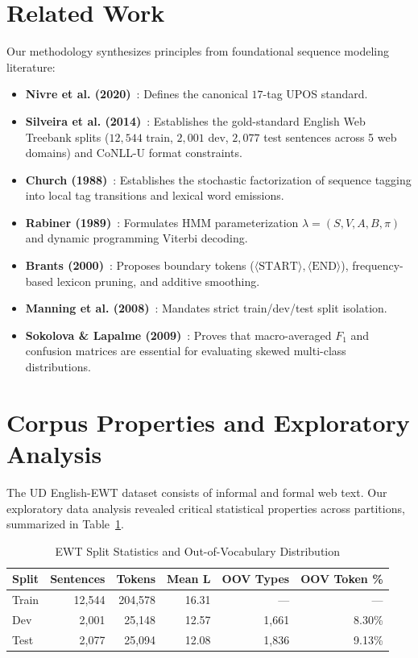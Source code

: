 \documentclass[conference]{IEEEtran}
\begin{document}
\section{Related Work}
Our methodology synthesizes principles from foundational sequence modeling literature:
\begin{itemize}
    \item \textbf{Nivre et al. (2020)}~\cite{nivre2020universal}: Defines the canonical $17$-tag UPOS standard.
    \item \textbf{Silveira et al. (2014)}~\cite{silveira2014gold}: Establishes the gold-standard English Web Treebank splits ($12,544$ train, $2,001$ dev, $2,077$ test sentences across 5 web domains) and CoNLL-U format constraints.
    \item \textbf{Church (1988)}~\cite{church1988stochastic}: Establishes the stochastic factorization of sequence tagging into local tag transitions and lexical word emissions.
    \item \textbf{Rabiner (1989)}~\cite{rabiner1989tutorial}: Formulates HMM parameterization $\lambda = (S, V, A, B, \pi)$ and dynamic programming Viterbi decoding.
    \item \textbf{Brants (2000)}~\cite{brants2000tnt}: Proposes boundary tokens ($\langle\text{START}\rangle, \langle\text{END}\rangle$), frequency-based lexicon pruning, and additive smoothing.
    \item \textbf{Manning et al. (2008)}~\cite{manning2008introduction}: Mandates strict train/dev/test split isolation.
    \item \textbf{Sokolova \& Lapalme (2009)}~\cite{sokolova2009systematic}: Proves that macro-averaged $F_1$ and confusion matrices are essential for evaluating skewed multi-class distributions.
\end{itemize}

\section{Corpus Properties and Exploratory Analysis}
The UD English-EWT dataset consists of informal and formal web text. Our exploratory data analysis revealed critical statistical properties across partitions, summarized in Table~\ref{tab:splits}.

\begin{table}[htbp]
\caption{EWT Split Statistics and Out-of-Vocabulary Distribution}
\label{tab:splits}
\centering
\begin{tabular}{lrrrrr}
\toprule
\textbf{Split} & \textbf{Sentences} & \textbf{Tokens} & \textbf{Mean L} & \textbf{OOV Types} & \textbf{OOV Token \%} \\
\midrule
Train & 12,544 & 204,578 & 16.31 & --- & --- \\
Dev   &  2,001 &  25,148 & 12.57 & 1,661 & 8.30\% \\
Test  &  2,077 &  25,094 & 12.08 & 1,836 & 9.13\% \\
\bottomrule
\end{tabular}
\end{table}
\end{document}

